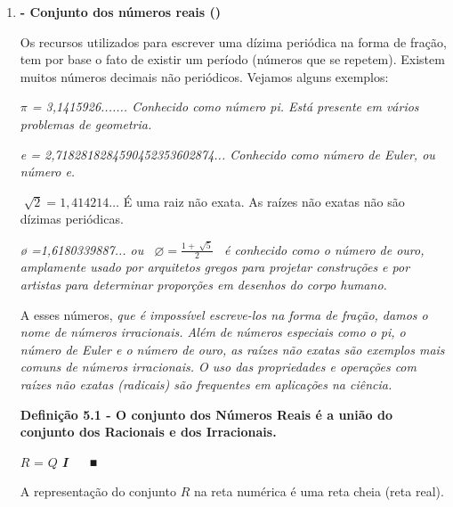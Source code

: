 \documentclass[12pt]{article}
\renewcommand{\_}{\kern-1.5pt\textunderscore\kern-1.5pt}
\begin{document}
\vspace{\baselineskip}

\vspace{\baselineskip}

\vspace{\baselineskip}
\begin{enumerate}[label*={\fontsize{12pt}{12pt}\selectfont \textbf{\arabic*.}}]
	\item \textbf{- Conjunto dos números reais ()}\par

Os recursos utilizados para escrever uma dízima periódica na forma de fração, tem por base o fato de existir um período (números que se repetem). Existem muitos números decimais não periódicos. Vejamos alguns exemplos:\par

\textit{$ \pi $  = 3,1415926....... Conhecido como número pi. Está presente em vários problemas de geometria.}\par

\textit{e = 2,7182818284590452353602874... Conhecido como número de Euler, ou número e.}\par

 \( \sqrt[]{2}=1,414214 \ldots  \)  É uma raiz não exata. As raízes não exatas não são dízimas periódicas.\par

\textit{ø =1,6180339887... ou \   \(  \varnothing =\frac{1+\sqrt[]{5}}{2} \) \  é conhecido como o número de ouro, amplamente usado por arquitetos gregos para projetar construções e por artistas para determinar proporções em desenhos do corpo humano. }\par

A esses números, \textit{que é impossível escreve-los na forma de fração, damos o nome de números irracionais. Além de números especiais como o pi, o número de Euler e o número de ouro, as raízes não exatas são exemplos mais comuns de números irracionais. O uso das propriedades e operações com raízes não exatas (radicais) são frequentes em aplicações na ciência.}\par

\textbf{Definição 5.1 - O conjunto dos Números Reais é a união do conjunto dos Racionais e dos Irracionais. }\par

\tab  \( R \)  =  \( Q \)   \textbf{\textit{I\ \ \  ■}}\par


\vspace{\baselineskip}
A representação do conjunto  \( R \)  na reta numérica é uma reta cheia (reta real).\par




\end{enumerate}
\end{document}
